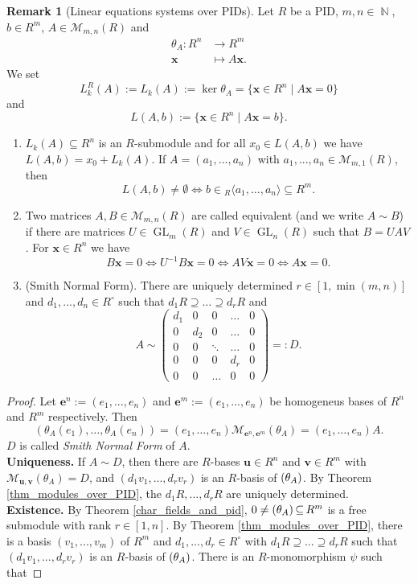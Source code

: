 \documentclass[12pt,a4paper]{report}
\theoremstyle{definition}
\newtheorem{Remark}[theorem]{Remark}
\theoremstyle{num.custom-title}
\let\o\relax %
\DeclareMathOperator{\o}{\mathsf{o}}
\let\Im\relax %
\DeclareMathOperator{\Im}{Im}
\DeclareMathOperator{\N}{\mathbb{N}}
\DeclareMathOperator{\sse}{\subseteq}
\DeclareMathOperator{\GL}{GL}
\newcommand{\M}{\mathcal{M}}
\newcommand{\x}{\mathbf{x}}
\renewcommand{\iff}{\Leftrightarrow}
\begin{document}
\begin{Remark}[Linear equations systems over PIDs]
Let $R$ be a PID, $m,n \in \N$, $b \in R^m$, $A \in \M_{m,n}(R)$ and
\begin{align*}
\theta_A \colon R^n & \to R^m \\
\x &\mapsto A \x.
\end{align*}
We set
\[
L_k^R(A) := L_k(A) := \ker \theta_A = \{\x \in R^n \mid A\x = 0\}
\]
and
\[
L(A,b) := \{\x \in R^n \mid A\x = b\}.
\]
\begin{enumerate}
\item $L_k(A) \sse R^n$ is an $R$-submodule and for all $x_0 \in L(A,b)$ we have $L(A,b) = x_0 + L_k(A)$. If $A=(a_1,...,a_n)$ with $a_1,...,a_n \in \M_{m,1}(R)$, then
\[
L(A,b) \neq \emptyset \iff b \in {}_R \langle a_1, \ldots, a_n \rangle \sse R^m.
\]
\item Two matrices $A,B \in \M_{m,n}(R)$ are called equivalent (and we write $A \sim B$) if there are matrices $U \in \GL_m(R)$ and $V \in \GL_n(R)$ such that $B=UAV$. For $\x \in R^n$ we have
\[
B\x = 0 \iff U^{-1} B \x = 0 \iff A V \x = 0 \iff A \x = 0.
\]
\item (Smith Normal Form). There are uniquely determined $r \in [1,\min(m,n)]$ and $d_1,...,d_n \in R^\circ$ such that $d_1 R \supseteq \ldots \supseteq d_r R$ and
\[
A \sim
\begin{pmatrix}
d_1 & 0 & 0 & \ldots & 0 \\
0 & d_2 & 0 & \ldots & 0 \\
0 & 0 & \ddots & \ldots & 0 \\
0 & 0 & 0 & d_r & 0 \\
0 & 0 & \ldots & 0 & 0
\end{pmatrix}
=: D.
\]
\end{enumerate}
\begin{proof}
Let $\mathbf{e}^n := (e_1,...,e_n)$ and $\mathbf{e}^m := (e_1,...,e_n)$ be homogeneus bases of $R^n$ and $R^m$ respectively. Then
\[
(\theta_A(e_1),\ldots,\theta_A(e_n)) = (e_1,\ldots,e_n) \M_{\mathbf{e}^n,\mathbf{e}^m}(\theta_A) = (e_1,\ldots,e_n)A.
\]
$D$ is called \emph{Smith Normal Form} of $A$.\\
\textbf{Uniqueness.} If $A \sim D$, then there are $R$-bases $\mathbf{u} \in R^n$ and $\mathbf{v} \in R^m$ with $\M_{\mathbf{u},\mathbf{v}}(\theta_A) = D$, and $(d_1 v_1,...,d_r v_r)$ is an $R$-basis of $\Im(\theta_A)$. By Theorem \ref{thm_modules_over_PID}, the $d_1 R,...,d_r R$ are uniquely determined.\\
\textbf{Existence.} By Theorem \ref{char_fields_and_pid}, $0 \neq \Im(\theta_A) \sse R^m$ is a free submodule with rank $r \in [1,n]$. By Theorem \ref{thm_modules_over_PID}, there is a basis $(v_1,...,v_m)$ of $R^m$ and $d_1,...,d_r \in R^\circ$ with $d_1 R \supseteq \ldots \supseteq d_r R$ such that $(d_1 v_1,...,d_r v_r)$ is an $R$-basis of $\Im(\theta_A)$. There is an $R$-monomorphism $\psi$ such that

\end{proof}
\end{Remark}
\end{document}
